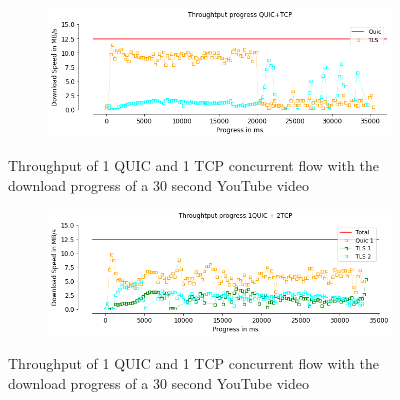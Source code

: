 \begin{frame}
\begin{figure}[!htb]
    \centering
    \begin{subfigure}{0.45\textwidth}
        \includegraphics[width=\linewidth]{./plots/youtube/throughput/ThroughtputprogressQUIC+TCP.png}
    \end{subfigure}
    
    \caption{Throughput of 1 QUIC and 1 TCP concurrent flow with the download progress of a 30 second YouTube video}\label{fig:throughput-of-1}
\end{figure}


\begin{figure}[!htb]
    \centering
    \begin{subfigure}{0.45\textwidth}
        \includegraphics[width=\linewidth]{./plots/youtube/throughput/Throughtputprogress1QUIC+2TCP.png}
    \end{subfigure}
    
    \caption{Throughput of 1 QUIC and 1 TCP concurrent flow with the download progress of a 30 second YouTube video}\label{fig:throughput-of-2}
\end{figure}

\end{frame}
\clearpage

